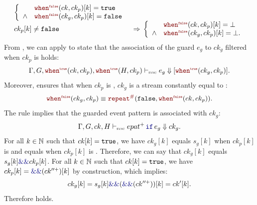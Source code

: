 \begin{skippableproof}
\begin{align}
\begin{array}{ll}
               \left\{
               \begin{array}{ll}
                       & \whenF{ck}{ck_p}[k] = \true    \\
                \wedge & \whenF{ck_g}{ck_p}[k] = \false \\
            \end{array}
               \right.                              \\
               ck_p[k] \neq \false & \Rightarrow \,
               \left\{
               \begin{array}{ll}
                       & \whenF{ck}{ck_p}[k] = \bot    \\
                \wedge & \whenF{ck_g}{ck_p}[k] = \bot. \\
            \end{array}
               \right.                              \\
           \end{array} \label{eq:semantics:grsync:theorems:equivalence:epats:whenF}
    \end{align}
    From , we can apply  to state that the association of the guard $e_g$ to $ck_g$ filtered when $ck_p$ is
    \true holds: $$\exprDenot{\whenT{H}{ck_p}}{\whenT{ck}{ck_p}}{e_g}{
            \whenT{ck_g}{ck_p}}.$$
    Moreover,  ensures that when $ck_p$ is \false,
    $ck_g$ is a stream constantly equal to \false: $$\whenF{ck_g}{ck_p} \equiv
        \const{\false}{\whenF{ck}{ck_p}}.$$
    The rule  implies that the guarded event pattern
     is associated with $ck_g$: $$\epatDenot{H}{ck}{\guarded{epat^+}{e_g}}{ck_g}.$$
    For all $k \in \mathbb{N}$ such that $ck[k] = \mathtt{{true}}$, we have $ck_g[k]$ equals $s_g[k]$
    when $ck_p[k]$ is \true and equals \false when $ck_p[k]$ is \false. Therefore, we
    can say that $ck_g[k]$ equals $s_g[k] \kwf{\&\&} ck_p[k]$. For all $k \in \mathbb{N}$ such that
    $ck[k] = \mathtt{{true}}$, we have $ck_p[k] = \kwf{\&\&}(ck^{\prime\prime+})[k]$ by construction,
    which implies: $$ck_g[k] = s_g[k] \kwf{\&\&} (\kwf{\&\&} (ck^{\prime\prime+}))[k] = ck'[k].$$
    Therefore  holds.


\end{skippableproof}
